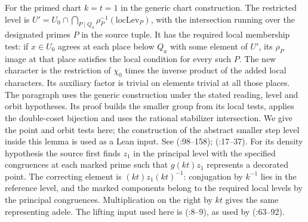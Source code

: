 For the primed chart $k=t=1$ in the generic chart construction.
The restricted level is $U'=U_0\cap\bigcap_{P\mid Q_a}
\rho_P^{-1}(\mathrm{locLev}_P)$, with the intersection running over
the designated primes $P$ in the source tuple. It has the required local
membership test: if $x\in U_0$ agrees at each place below $Q_a$ with
some element of $U'$, its $\rho_P$ image at that place satisfies the
local condition for every such $P$. The new character is the restriction
of $\chi_0$ times the inverse product of the added local characters.
Its auxiliary factor is trivial on elements trivial at all those places.
The paragraph uses the generic construction
 under the stated reading, level and
orbit hypotheses. Its proof builds the smaller group from its local
tests, applies the double-coset bijection and uses the rational
stabilizer intersection. We give the point and orbit tests here;
the construction of the abstract smaller step level inside this
lemma is used as a Lean input. See 
(:98--158);
(:17--37).
For its density hypothesis the source first finds $z_1$ in the
principal level with the specified congruences at each marked prime
such that $g(k t)z_1$ represents a decorated point.
The correcting element is $(kt)z_1(kt)^{-1}$: conjugation by $k^{-1}$
lies in the reference level, and the marked components belong to
the required local levels by the principal congruences. Multiplication
on the right by $kt$ gives the same representing adele.
The lifting input used here is
(:8--9),
as used by 
(:63--92).
